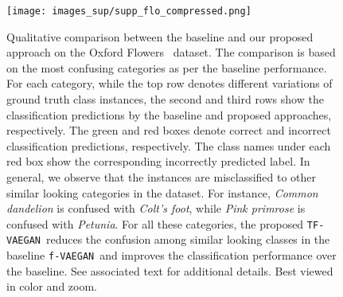 \documentclass[runningheads]{llncs}
\newcommand{\vaegan}{\texttt{f-VAEGAN}}
\newcommand{\proposed}{\texttt{TF-VAEGAN}}
\begin{document}
\clearpage



\begin{figure}[t]
\centering
\texttt{[image: images\_sup/supp\_flo\_compressed.png]}
\caption{\label{fig_flo_supp}Qualitative comparison between the baseline and our proposed approach on the Oxford Flowers~\cite{flo} dataset. The comparison is based on the most confusing categories as per the baseline performance. For each category, while the top row denotes different variations of ground truth class instances, the second and third rows show the classification predictions by the baseline and proposed approaches, respectively. The green and red boxes denote correct and incorrect classification predictions, respectively. The class names under each red box show the corresponding incorrectly predicted label. In general, we observe that the instances are misclassified to other similar looking categories in the dataset. For instance, \textit{Common dandelion} is confused with \textit{Colt's foot}, while \textit{Pink primrose} is confused with \textit{Petunia}. For all these categories, the proposed \proposed~reduces the confusion among similar looking classes in the baseline \vaegan~and improves the classification performance over the baseline. See associated text for additional details. Best viewed in color and zoom.}
\end{figure}

\clearpage
\end{document}
